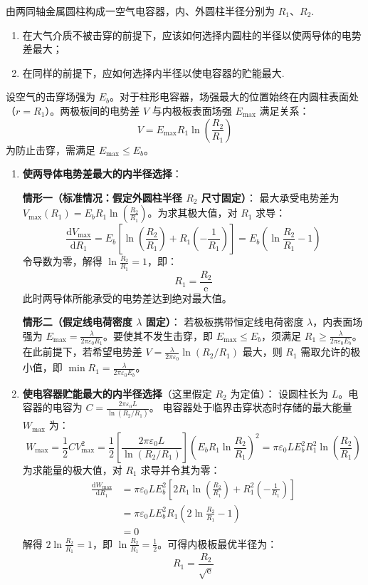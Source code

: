 \begin{exercise}\label{ex:16.5}
由两同轴金属圆柱构成一空气电容器，内、外圆柱半径分别为 $R_1$、$R_2$.
\begin{enumerate}
  \item[(a)] 在大气介质不被击穿的前提下，应该如何选择内圆柱的半径以使两导体的电势差最大；
  \item[(b)] 在同样的前提下，应如何选择内半径以使电容器的贮能最大.
\end{enumerate}
\end{exercise}
\begin{solution}
设空气的击穿场强为 $E_b$。对于柱形电容器，场强最大的位置始终在内圆柱表面处（$r = R_1$）。两极板间的电势差 $V$ 与内极板表面场强 $E_{\max}$ 满足关系：
$$ V = E_{\max} R_1 \ln\left(\frac{R_2}{R_1}\right) $$
为防止击穿，需满足 $E_{\max} \le E_b$。

\begin{enumerate}
    \item[(a)] \textbf{使两导体电势差最大的内半径选择}：
    
    \textbf{情形一（标准情况：假定外圆柱半径 $R_2$ 尺寸固定）}：
    最大承受电势差为 $V_{\max}(R_1) = E_b R_1 \ln\left(\frac{R_2}{R_1}\right)$。为求其极大值，对 $R_1$ 求导：
    $$ \frac{\mathrm{d}V_{\max}}{\mathrm{d}R_1} = E_b \left[ \ln\left(\frac{R_2}{R_1}\right) + R_1 \left( -\frac{1}{R_1} \right) \right] = E_b \left( \ln\frac{R_2}{R_1} - 1 \right) $$
    令导数为零，解得 $\ln\frac{R_2}{R_1} = 1$，即：
    $$ R_1 = \frac{R_2}{\mathrm{e}} $$
    此时两导体所能承受的电势差达到绝对最大值。

    \textbf{情形二（假定线电荷密度 $\lambda$ 固定）}：
    若极板携带恒定线电荷密度 $\lambda$，内表面场强为 $E_{\max} = \frac{\lambda}{2\pi\varepsilon_0 R_1}$。要使其不发生击穿，即 $E_{\max} \le E_b$，须满足 $R_1 \ge \frac{\lambda}{2\pi\varepsilon_0 E_b}$。在此前提下，若希望电势差 $V = \frac{\lambda}{2\pi\varepsilon_0} \ln(R_2/R_1)$ 最大，则 $R_1$ 需取允许的极小值，即 $\min R_1 = \frac{\lambda}{2\pi\varepsilon_0 E_b}$。

    \item[(b)] \textbf{使电容器贮能最大的内半径选择}（这里假定 $R_2$ 为定值）：
    设圆柱长为 $L$。电容器的电容为 $C = \frac{2\pi\varepsilon_0 L}{\ln(R_2/R_1)}$。
    电容器处于临界击穿状态时存储的最大能量 $W_{\max}$ 为：
    $$ W_{\max} = \frac{1}{2} C V_{\max}^2 = \frac{1}{2} \left[ \frac{2\pi\varepsilon_0 L}{\ln(R_2/R_1)} \right] \left( E_b R_1 \ln\frac{R_2}{R_1} \right)^2 = \pi\varepsilon_0 L E_b^2 R_1^2 \ln\left(\frac{R_2}{R_1}\right) $$
    为求能量的极大值，对 $R_1$ 求导并令其为零：
    \[
    \begin{aligned}
    \frac{\mathrm{d}W_{\max}}{\mathrm{d}R_1} &= \pi\varepsilon_0 L E_b^2 \left[ 2R_1 \ln\left(\frac{R_2}{R_1}\right) + R_1^2 \left( -\frac{1}{R_1} \right) \right]\\
      &= \pi\varepsilon_0 L E_b^2 R_1 \left( 2\ln\frac{R_2}{R_1} - 1 \right)\\
      &= 0
    \end{aligned}
    \]
    解得 $2\ln\frac{R_2}{R_1} = 1$，即 $\ln\frac{R_2}{R_1} = \frac{1}{2}$。可得内极板最优半径为：
    $$ R_1 = \frac{R_2}{\sqrt{\mathrm{e}}} $$
\end{enumerate}
\end{solution}

